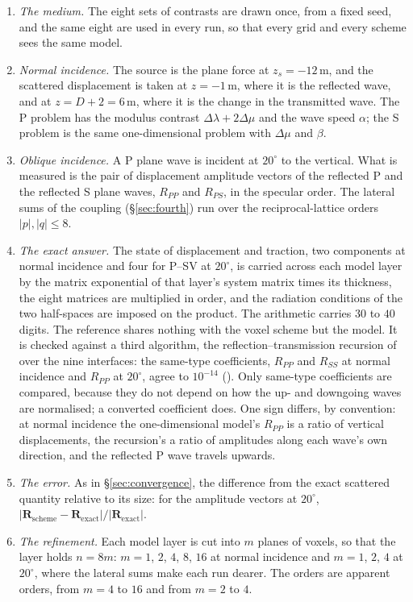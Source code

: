 \documentclass[11pt,a4paper]{article}
\begin{document}
\begin{enumerate}
\item \emph{The medium.} The eight sets of contrasts are drawn once, from a fixed seed, and the same
eight are used in every run, so that every grid and every scheme sees the same model.
\item \emph{Normal incidence.} The source is the plane force at $z_s=-12$\,m, and the scattered
displacement is taken at $z=-1$\,m, where it is the reflected wave, and at $z=D+2=6$\,m, where it is
the change in the transmitted wave. The P problem has the modulus contrast
$\Delta\lambda+2\Delta\mu$ and the wave speed $\alpha$; the S problem is the same one-dimensional
problem with $\Delta\mu$ and $\beta$.
\item \emph{Oblique incidence.} A P plane wave is incident at $20^\circ$ to the vertical. What is
measured is the pair of displacement amplitude vectors of the reflected P and the reflected S plane
waves, $R_{PP}$ and $R_{PS}$, in the specular order. The lateral sums of the coupling
(\S\ref{sec:fourth}) run over the reciprocal-lattice orders $\lvert p\rvert,\lvert q\rvert\le8$.
\item \emph{The exact answer.} The state of displacement and traction, two components at normal
incidence and four for P--SV at $20^\circ$, is carried across each model layer by the matrix
exponential of that layer's system matrix times its thickness, the eight matrices are multiplied in
order, and the radiation conditions of the two half-spaces are imposed on the product. The arithmetic
carries $30$ to $40$ digits. The reference shares nothing with the voxel scheme but the model. It is
checked against a third algorithm, the reflection--transmission recursion of \citet{Kennett1983} over
the nine interfaces: the same-type coefficients, $R_{PP}$ and $R_{SS}$ at normal incidence and $R_{PP}$
at $20^\circ$, agree to $10^{-14}$ (). Only
same-type coefficients are compared, because they do not depend on how the up- and downgoing waves are
normalised; a converted coefficient does. One sign differs, by convention: at normal incidence the
one-dimensional model's $R_{PP}$ is a ratio of vertical displacements, the recursion's a ratio of
amplitudes along each wave's own direction, and the reflected P wave travels upwards.
\item \emph{The error.} As in \S\ref{sec:convergence}, the difference from the exact scattered
quantity relative to its size: for the amplitude vectors at $20^\circ$,
$\lvert\mathbf{R}_{\text{scheme}}-\mathbf{R}_{\text{exact}}\rvert/\lvert\mathbf{R}_{\text{exact}}\rvert$.
\item \emph{The refinement.} Each model layer is cut into $m$ planes of voxels, so that the layer
holds $n=8m$: $m=1$, $2$, $4$, $8$, $16$ at normal incidence and $m=1$, $2$, $4$ at $20^\circ$, where the
lateral sums make each run dearer. The orders are apparent orders, from $m=4$ to $16$ and from $m=2$ to
$4$.
\end{enumerate}
\end{document}
